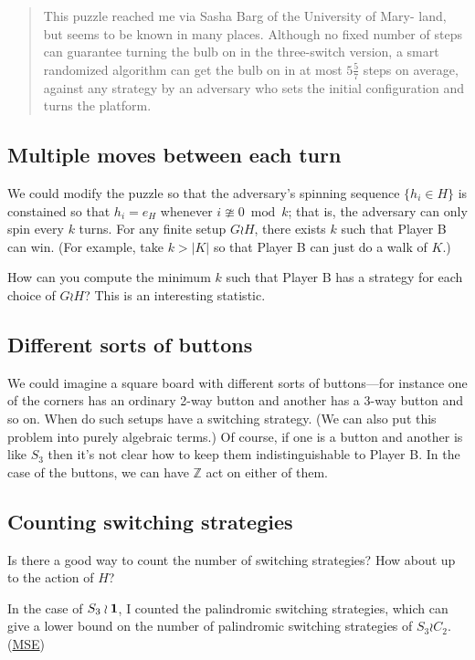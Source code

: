 \begin{quote}
  This puzzle reached me via Sasha Barg of the University of Mary-
  land, but seems to be known in many places. Although no fixed number of steps
  can guarantee turning the bulb on in the three-switch version, a smart randomized
  algorithm can get the bulb on in at most $5 \frac{5}{7}$ steps on average, against any strategy
  by an adversary who sets the initial configuration and turns the platform. \cite{Winkler2021}
\end{quote}

\subsection{Multiple moves between each turn}
We could modify the puzzle so that the adversary's spinning sequence
$\{h_i \in H\}$ is constained so that $h_i = e_H$ whenever $i \ncong 0 \bmod k$;
that is, the adversary can only spin every $k$ turns. For any finite setup
$G \wr H$, there exists $k$ such that Player B can win.
(For example, take $k > |K|$ so that Player B can just do a walk of $K$.)

How can you compute the minimum $k$ such that Player B has a strategy for each
choice of $G \wr H$? This is an interesting statistic.

\subsection{Different sorts of buttons}
We could imagine a square board with different sorts of buttons---for instance
one of the corners has an ordinary 2-way button and another has a 3-way button
and so on. When do such setups have a switching strategy.
(We can also put this problem into purely algebraic terms.)
Of course, if one is a button and another is like $S_3$ then it's not clear how
to keep them indistinguishable to Player B. In the case of the buttons,
we can have $\mathbb Z$ act on either of them.

\subsection{Counting switching strategies}
Is there a good way to count the number of switching strategies?
How about up to the action of $H$?

In the case of $S_3 \wr \bf{1}$, I counted the palindromic switching
strategies, which can give a lower bound on the number of palindromic
switching strategies of $S_3 \wr C_2$.
(\href{https://math.stackexchange.com/q/3717562/121988}{MSE})

